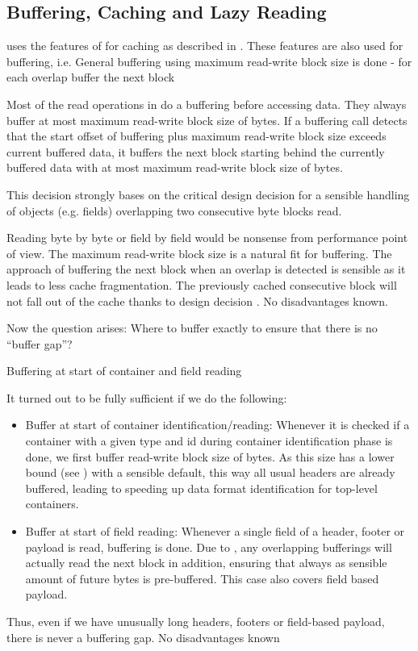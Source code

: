 \subsection{Buffering, Caching and Lazy Reading}%
\label{sec:ReadingSteps}%

\COMPdataPartManagement{} uses the features of \COMPmedia{} for caching as described in . These features are also used for buffering, i.e.
{%
General buffering using maximum read-write block size is done - for each overlap buffer the next block
}
{%
  Most of the read operations in \COMPdataPartManagement{} do a buffering before accessing data. They always buffer at most maximum read-write block size of bytes. If a buffering call detects that the start offset of buffering plus maximum read-write block size exceeds current buffered data, it buffers the next block starting behind the currently buffered data with at most maximum read-write block size of bytes.

  This decision strongly bases on the critical design decision  for a sensible handling of objects (e.g. fields) overlapping two consecutive byte blocks read.
}
{%
Reading byte by byte or field by field would be nonsense from performance point of view. The maximum read-write block size is a natural fit for buffering. The approach of buffering the next block when an overlap is detected is sensible as it leads to less cache fragmentation. The previously cached consecutive block will not fall out of the cache thanks to design decision .
}
{%
No disadvantages known.
}

Now the question arises: Where to buffer exactly to ensure that there is no ``buffer gap''?

{%
Buffering at start of container and field reading
}
{%
  It turned out to be fully sufficient if we do the following:
  \begin{itemize}
  \item Buffer at start of container identification/reading: Whenever it is checked if a container with a given type and id during container identification phase is done, we first buffer read-write block size of bytes. As this size has a lower bound (see ) with a sensible default, this way all usual headers are already buffered, leading to speeding up data format identification for top-level containers.
  \item Buffer at start of field reading: Whenever a single field of a header, footer or payload is read, buffering is done. Due to , any overlapping bufferings will actually read the next block in addition, ensuring that always as sensible amount of future bytes is pre-buffered. This case also covers field based payload.
  \end{itemize}
}
{%
Thus, even if we have unusually long headers, footers or field-based payload, there is never a buffering gap.
}
{%
No disadvantages known
}

